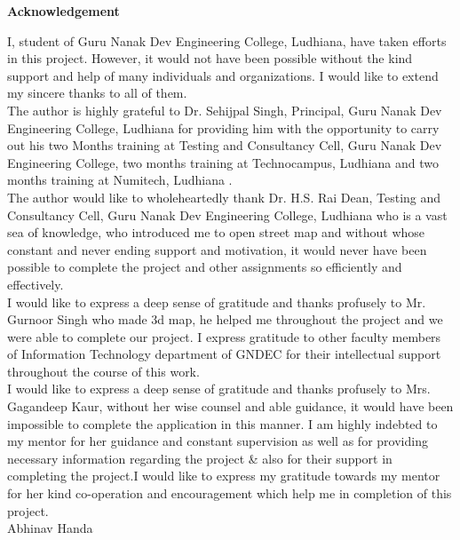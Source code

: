 \begin{center}
{\Huge \bf{Acknowledgement}\vskip 0.2in}
\end{center}

I, student of Guru Nanak Dev Engineering College, Ludhiana, have taken efforts in this project.
However, it would not have been possible without the kind support and help of many individuals
and organizations. I would like to extend my sincere thanks to all of them.\\

The author is highly grateful to Dr. Sehijpal Singh, Principal, Guru Nanak Dev Engineering College, Ludhiana for providing him with the opportunity to carry out his two Months training at Testing and Consultancy Cell, Guru Nanak Dev Engineering College, two months training at Technocampus, Ludhiana and two months training at Numitech, Ludhiana .\\

The author would like to wholeheartedly thank Dr. H.S. Rai Dean, Testing and Consultancy Cell, Guru Nanak Dev Engineering College, Ludhiana who is a vast sea of knowledge, who introduced me to open street map and without whose constant and never ending support and motivation, it would never have been possible to complete the project and other assignments so efficiently and effectively.\\
I would like to express a deep sense of gratitude and thanks profusely to Mr. Gurnoor Singh who made 3d map, he helped me throughout the project and we were able to complete our project. I express gratitude to other faculty members of Information Technology department of GNDEC for their intellectual support throughout the course of this work.\\

I would like to express a deep sense of gratitude and thanks profusely to Mrs. Gagandeep Kaur, without her wise counsel and able guidance, it would have been impossible to complete the application in this manner. I am highly indebted to my mentor for her guidance and constant supervision as well as for providing necessary information regarding the project & also for their support in completing the project.I would like to express my gratitude towards my mentor for her kind co-operation and encouragement which help me in completion of this project.\\


\vskip 1.0cm 
\noindent Abhinav Handa 



